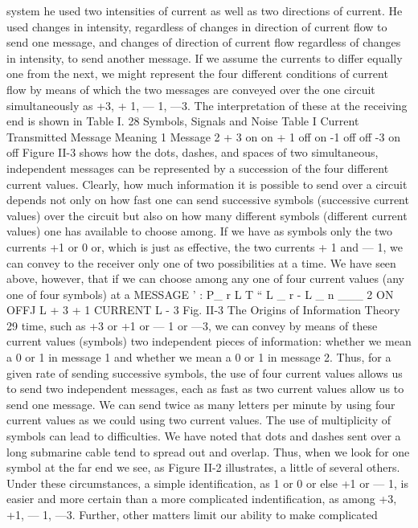 system he used two intensities of current as well as two
directions of current. He used changes in intensity, regardless of
changes in direction of current flow to send one message, and
changes of direction of current flow regardless of changes in
intensity, to send another message. If we assume the currents to
differ equally one from the next, we might represent the four
different conditions of current flow by means of which the two
messages are conveyed over the one circuit simultaneously as +3,
+ 1, — 1, —3. The interpretation of these at the receiving end is
shown in Table I.
28 Symbols, Signals and Noise
Table I
Current Transmitted
Message
Meaning
1 Message 2
+ 3 on on
+ 1 off on
-1 off off
-3 on off
Figure II-3 shows how the dots, dashes, and spaces of two
simultaneous, independent messages can be represented by a succession
of the four different current values.
Clearly, how much information it is possible to send over a
circuit depends not only on how fast one can send successive
symbols (successive current values) over the circuit but also on how
many different symbols (different current values) one has available
to choose among. If we have as symbols only the two currents +1
or 0 or, which is just as effective, the two currents + 1 and — 1,
we can convey to the receiver only one of two possibilities at a
time. We have seen above, however, that if we can choose among
any one of four current values (any one of four symbols) at a
MESSAGE
' : P_ r L T “ L _ r - L _ n ___
2
ON
OFFJ L
+ 3
+ 1
CURRENT
L
- 3
Fig. II-3
The Origins of Information Theory
29
time, such as +3 or +1 or — 1 or —3, we can convey by means
of these current values (symbols) two independent pieces of information:
whether we mean a 0 or 1 in message 1 and whether we
mean a 0 or 1 in message 2. Thus, for a given rate of sending successive
symbols, the use of four current values allows us to send two
independent messages, each as fast as two current values allow us
to send one message. We can send twice as many letters per minute
by using four current values as we could using two current values.
The use of multiplicity of symbols can lead to difficulties. We
have noted that dots and dashes sent over a long submarine cable
tend to spread out and overlap. Thus, when we look for one symbol
at the far end we see, as Figure II-2 illustrates, a little of several
others. Under these circumstances, a simple identification, as 1 or
0 or else +1 or — 1, is easier and more certain than a more complicated
indentification, as among +3, +1, — 1, —3.
Further, other matters limit our ability to make complicated
